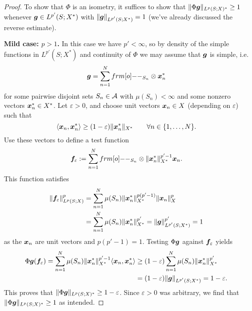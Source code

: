\begin{proof}
  To show that $\Phi$ is an isometry, it suffices to show that $\|\Phi \bm{g}\|_{L^p(S;X)^*} \geq 1$ whenever $\bm{g} \in L^{p'}(S;X^*)$ with $\|\bm{g}\|_{L^{p'}(S;X^*)} = 1$ (we've already discussed the reverse estimate).
  
  \textbf{Mild case: $p > 1$.}
  In this case we have $p' < \infty$, so by density of the simple functions in $L^{p'}(S;X^*)$ and continuity of $\Phi$ we may assume that $\bm{g}$ is simple, i.e.
  \begin{equation*}
    \mb{g} = \sum_{n=1}^N \1_{S_n} \otimes \mb{x}_n^*
  \end{equation*}
  for some pairwise disjoint sets $S_n \in \mathcal{A}$ with $\mu(S_n) < \infty$ and some nonzero vectors $\bm{x}_n^* \in X^*$.
  Let $\varepsilon > 0$, and choose unit vectors $\bm{x}_n \in X$ (depending on $\varepsilon$) such that
  \begin{equation*}
    \langle \bm{x}_n, \bm{x}_n^* \rangle \geq (1-\varepsilon)\|\bm{x}_n^*\|_{X^*} \qquad \forall n \in \{1,\ldots,N\}.
  \end{equation*}
  Use these vectors to define a test function
  \begin{equation*}
    \mb{f}_\varepsilon := \sum_{n=1}^N \1_{S_n} \otimes \|\mb{x}_n^*\|_{X^*}^{p' - 1} \mb{x}_n.
  \end{equation*}
  This function satisfies
  \begin{equation*}
    \begin{aligned}
      \|\bm{f}_\varepsilon\|_{L^p(S;X)}^p &= \sum_{n=1}^N \mu(S_n) \|\bm{x}_n^*\|_{X^*}^{p(p' - 1)} \|\bm{x}_n\|_{X}^p \\
      &= \sum_{n=1}^N \mu(S_n) \|\bm{x}_n^*\|_{X^*}^{p'}
      = \|\bm{g}\|_{L^{p'}(S;X^*)}^{p'} = 1
    \end{aligned}
  \end{equation*}
  as the $\bm{x}_n$ are unit vectors and $p(p' - 1) = 1$.
  Testing $\Phi \bm{g}$ against $\bm{f}_{\varepsilon}$ yields
  \begin{equation*}
    \begin{aligned}
      \Phi \bm{g}(\bm{f}_\varepsilon) = \sum_{n=1}^N \mu(S_n) \|\bm{x}_n^*\|_{X^*}^{p' - 1} \langle \bm{x}_n, \bm{x}_n^* \rangle
      &\geq (1-\varepsilon) \sum_{n=1}^N \mu(S_n) \|\bm{x}_n^*\|_{X^*}^{p'} \\
      &= (1-\varepsilon) \|\bm{g}\|_{L^{p'}(S;X^*)} = 1-\varepsilon.
    \end{aligned}
  \end{equation*}
  This proves that $\|\Phi \bm{g}\|_{L^p(S;X)^*} \geq 1-\varepsilon$.
  Since $\varepsilon > 0$ was arbitrary, we find that $\|\Phi \bm{g}\|_{L^p(S;X)^*} \geq 1$ as intended.


\end{proof}
